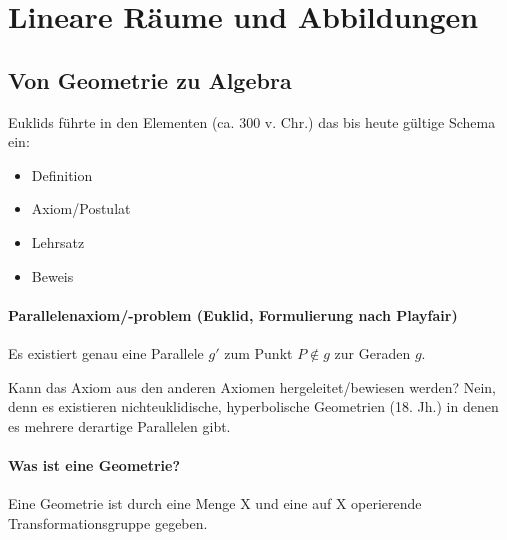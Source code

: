 \documentclass[12pt,a4paper,parskip=half-,DIV=15]{scrartcl}
\begin{document}
\section{Lineare Räume und Abbildungen}
\subsection{Von Geometrie zu Algebra}
Euklids führte in den \glqq Elementen\grqq{} (ca. 300 v. Chr.) das bis heute gültige Schema ein:
\begin{itemize}
\item Definition\item Axiom/Postulat\item Lehrsatz\item Beweis
\end{itemize}
\paragraph{Parallelenaxiom/-problem (Euklid, Formulierung nach Playfair)} Es existiert genau eine Parallele $ g' $ zum Punkt $ P \notin g $ zur Geraden $ g $.


Kann das Axiom aus den anderen Axiomen hergeleitet/bewiesen werden? Nein, denn es existieren nichteuklidische, hyperbolische Geometrien (18. Jh.) in denen es mehrere derartige Parallelen gibt.

\begin{figure}[H]
\begin{minipage}{.45\textwidth}
\end{minipage}
\begin{minipage}{.45\textwidth}
\end{minipage}
\end{figure}

\paragraph{Was ist eine Geometrie?} Eine Geometrie ist durch eine Menge X und eine auf X operierende Transformationsgruppe gegeben.
\end{document}
